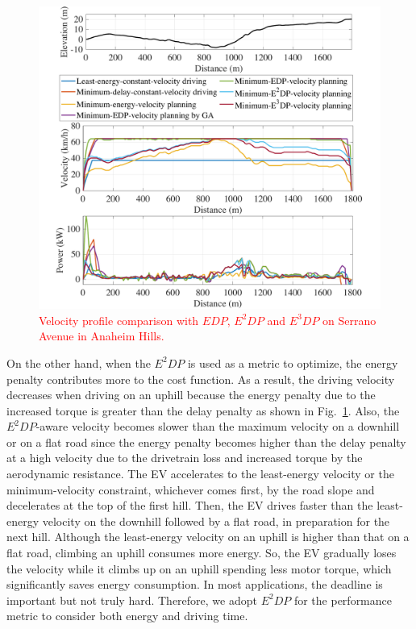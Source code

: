 \documentclass{IEEEtran}
\begin{document}
\begin{figure} %
\centering
\includegraphics[width=\hsize]{Figures/EDP_comp_profile.pdf}
\caption{\textcolor{red}{Velocity profile comparison with $EDP$, $E^2DP$ and $E^3DP$ on  Serrano Avenue in Anaheim Hills.}}
\label{fig:EDP_aware_velocity_planning}
\end{figure} 

On the other hand, when the $E^2DP$ is used as a metric to optimize, the energy penalty contributes more to the cost function. As a result, the driving velocity decreases when driving on an uphill because the energy penalty due to the increased torque is greater than the delay penalty as shown in Fig.~\ref{fig:EDP_aware_velocity_planning}. Also, the $E^2DP$-aware velocity becomes slower than the maximum velocity on a downhill or on a flat road since the energy penalty becomes higher than the delay penalty at a high velocity due to the drivetrain loss and increased torque by the aerodynamic resistance. The EV accelerates to the least-energy velocity or the minimum-velocity constraint, whichever comes first, by the road slope and decelerates at the top of the first hill. Then, the EV drives faster than the least-energy velocity on the downhill followed by a  flat road, in preparation for the next hill. Although the least-energy velocity on an uphill is higher than that on a flat road, climbing an uphill consumes more energy. So, the EV gradually loses the velocity while it climbs up on an uphill spending less motor torque, which significantly saves energy consumption. In most applications, the deadline is important but not truly hard. Therefore, we adopt $E^2DP$ for the performance metric to consider both energy and driving time.
\end{document}
